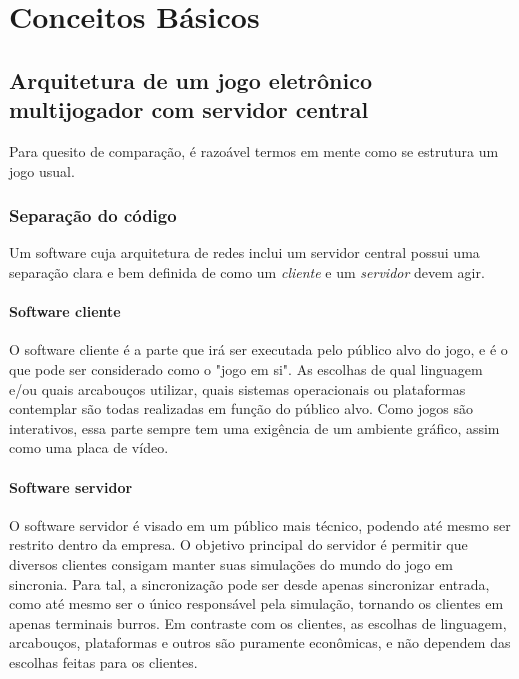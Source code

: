 \chapter{Conceitos Básicos}
\label{sec:conceitos}

\section{Arquitetura de um jogo eletrônico multijogador com servidor central}
\label{sec:conceitos:servidores}
  Para quesito de comparação, é razoável termos em mente como se estrutura um jogo usual.
    
  \subsection{Separação do código}
    Um software cuja arquitetura de redes inclui um servidor central possui uma separação
    clara e bem definida de como um \textit{cliente} e um \textit{servidor} devem agir.
    
    \subsubsection{Software cliente}
      O software cliente é a parte que irá ser executada pelo público alvo do jogo, e é o que
      pode ser considerado como o "jogo em si". As escolhas de qual linguagem e/ou quais arcabouços
      utilizar, quais sistemas operacionais ou plataformas contemplar são todas realizadas em
      função do público alvo.
      Como jogos são interativos, essa parte sempre tem uma exigência de um ambiente gráfico,
      assim como uma placa de vídeo.
      
    \subsubsection{Software servidor}
      O software servidor é visado em um público mais técnico, podendo até mesmo ser restrito dentro
      da empresa. O objetivo principal do servidor é permitir que diversos clientes consigam manter
      suas simulações do mundo do jogo em sincronia. Para tal, a sincronização pode ser desde
      apenas sincronizar entrada, como até mesmo ser o único responsável pela simulação, tornando
      os clientes em apenas terminais burros.
      Em contraste com os clientes, as escolhas de linguagem, arcabouços, plataformas e outros são
      puramente econômicas, e não dependem das escolhas feitas para os clientes.
      
